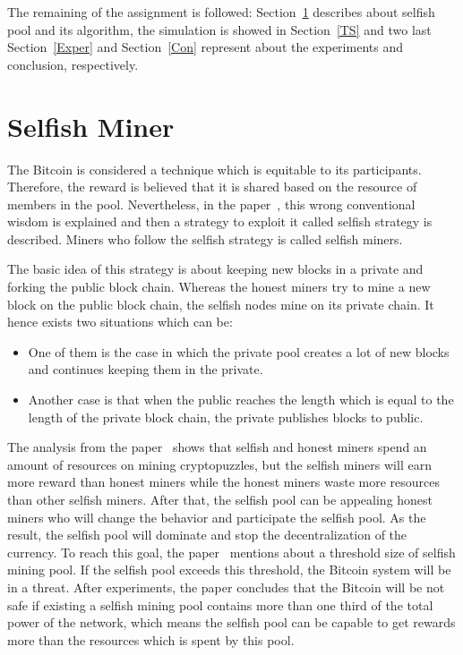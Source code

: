 \documentclass[runningheads,a4paper]{llncs}
\begin{document}
The remaining of the assignment is followed: Section~\ref{CA} describes about selfish pool and its algorithm, the simulation is showed in Section~\ref{TS} and two last Section~\ref{Exper} and Section~\ref{Con} represent about the experiments and conclusion, respectively.

\section{Selfish Miner}
\label{CA}
The Bitcoin is considered a technique which is equitable to its participants. Therefore, the reward is believed that it is shared based on the resource of members in the pool.
Nevertheless, in the paper~\cite{eyal2014majority}, this wrong conventional wisdom is explained and then a strategy to exploit it called selfish strategy is described.
Miners who follow the selfish strategy is called selfish miners.

The basic idea of this strategy is about keeping new blocks in a private and forking the public block chain.
Whereas the honest miners try to mine a new block on the public block chain, the selfish nodes mine on its private chain.
It hence exists two situations which can be:
\begin{itemize}
\item One of them is the case in which the private pool creates a lot of new blocks and continues keeping them in the private.
\item Another case is that when the public reaches the length which is equal to the length of the private block chain, the private publishes blocks to public.
\end{itemize}

The analysis from the paper~\cite{eyal2014majority} shows that selfish and honest miners spend an amount of resources on mining cryptopuzzles, but the selfish miners will earn more reward than honest miners while the honest miners waste more resources than other selfish miners.
After that, the selfish pool can be appealing honest miners who will change the behavior and participate the selfish pool.
As the result, the selfish pool will dominate and stop the decentralization of the currency.
To reach this goal, the paper~\cite{eyal2014majority} mentions about a threshold size of selfish mining pool. If the selfish pool exceeds this threshold, the Bitcoin system will be in a threat.
After experiments, the paper concludes that the Bitcoin will be not safe if existing a selfish mining pool contains more than one third of the total power of the network, which means the selfish pool can be capable to get rewards more than the resources which is spent by this pool.
\end{document}
